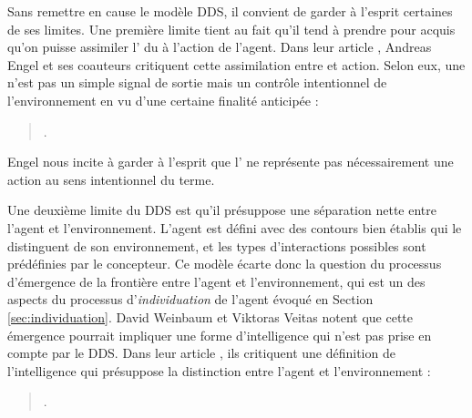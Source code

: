 
Sans remettre en cause le modèle DDS, il convient de garder à l'esprit certaines de ses limites.
Une première limite tient au fait qu'il tend à prendre pour acquis qu'on puisse assimiler l' du  à l'action de l'agent.  
Dans leur article \og {} \fg, Andreas Engel et ses coauteurs critiquent cette assimilation entre  et action. %
Selon eux, une  n'est pas un simple signal de sortie mais un contrôle intentionnel de l'environnement en vu d'une certaine finalité anticipée :
\begin{quote}
	\cite[p.~202]{engel_wheres_2013}.
\end{quote}

\noindent
Engel nous incite à garder à l'esprit que l' ne représente pas nécessairement une action au sens intentionnel du terme. 


Une deuxième limite du DDS est qu'il présuppose une séparation nette entre l'agent et l'environnement. 
L'agent est défini avec des contours bien établis qui le distinguent de son environnement, et les types d'interactions possibles sont prédéfinies par le concepteur. 
Ce modèle écarte donc la question du processus d'émergence de la frontière entre l'agent et l'environnement, qui est un des aspects du processus d'\emph{individuation} de l'agent évoqué en Section \ref{sec:individuation}.
David Weinbaum et Viktoras Veitas notent que cette émergence pourrait impliquer une forme d'intelligence qui n'est pas prise en compte par le DDS. 
Dans leur article \og {} \fg, ils critiquent une définition de l'intelligence qui présuppose la distinction entre l'agent et l'environnement : 

\begin{quote}
	\cite[p.~5]{weinbaum_open_2015}.
\end{quote}

